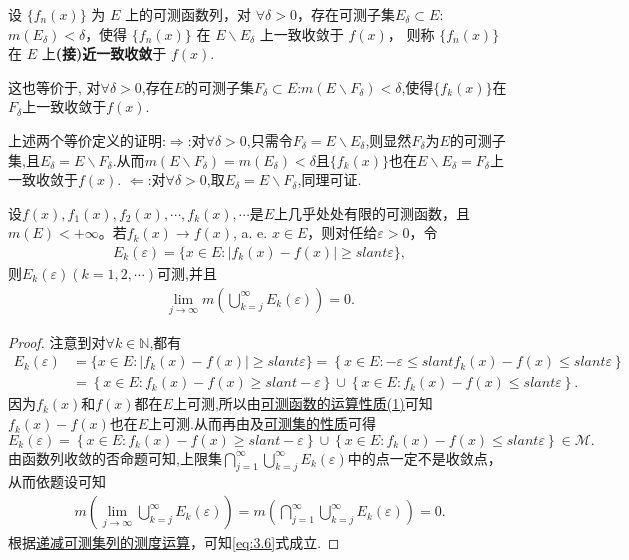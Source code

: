 \documentclass[../../main.tex]{subfiles}
\begin{document}
\begin{definition}[(接)近一致收敛]
设 $\{f_n(x)\}$ 为 $E$ 上的可测函数列，对 $\forall\delta > 0$，存在可测子集$E_\delta\subset E$:$m(E_\delta) < \delta$，使得 $\{f_n(x)\}$ 在 $E\backslash E_\delta$ 上一致收敛于 $f(x)$，
则称 $\{f_n(x)\}$ 在 $E$ 上\textbf{(接)近一致收敛}于 $f(x)$. 

这也等价于,
对$\forall \delta >0$,存在$E$的可测子集$F_\delta\subset E$:$m(E\backslash F_\delta)<\delta$,使得$\{f_k(x)\}$在$F_\delta$上一致收敛于$f(x)$.
\end{definition}
\begin{remark}
上述两个等价定义的证明:$\Rightarrow$:对$\forall \delta >0$,只需令$F_\delta=E\backslash E_\delta$,则显然$F_\delta$为$E$的可测子集,且$E_\delta=E\backslash F_\delta$.从而$m(E\backslash F_\delta)=m(E_\delta)<\delta$且$\{f_k(x)\}$也在$E\backslash E_\delta=F_\delta$上一致收敛于$f(x)$.
$\Leftarrow$:对$\forall \delta >0$,取$E_\delta=E\backslash F_\delta$,同理可证.
\end{remark}

\begin{lemma}\label{lemma:引理3.11}
设$f(x), f_1(x), f_2(x), \cdots, f_k(x), \cdots$是$E$上几乎处处有限的可测函数，且$m(E) < +\infty$。若$f_k(x) \to f(x)$, a. e. $x \in E$，则对任给$\varepsilon > 0$，令
\begin{align*}
E_k(\varepsilon) = \{x \in E: |f_k(x) - f(x)| \geqslant slant \varepsilon\},
\end{align*}
则$E_k(\varepsilon)(k=1,2,\cdots)$可测,并且
\begin{align}
\lim_{j \to \infty} m\left( \bigcup_{k = j}^{\infty} E_k(\varepsilon) \right) = 0. \label{eq:3.6}
\end{align}
\end{lemma}
\begin{proof}
注意到对$\forall k\in \mathbb{N}$,都有
\begin{align*}
E_k(\varepsilon )&=\{x\in E:|f_k(x)-f(x)|\geqslant slant \varepsilon \}=\left\{ x\in E:-\varepsilon \leqslant slant f_k(x)-f(x)\leqslant slant \varepsilon \right\} 
\\
&=\left\{ x\in E:f_k(x)-f(x)\geqslant slant -\varepsilon \right\} \cup \left\{ x\in E:f_k(x)-f(x)\leqslant slant \varepsilon \right\} .
\end{align*}
因为$f_k(x)$和$f(x)$都在$E$上可测,所以由\hyperref[theorem:可测函数的运算性质]{可测函数的运算性质(1)}可知$f_k(x)-f(x)$也在$E$上可测.从而再由及\hyperref[theorem:可测集的性质]{可测集的性质}可得
\[
E_k(\varepsilon)=\left\{ x\in E:f_k(x)-f(x)\geqslant slant -\varepsilon \right\} \cup \left\{ x\in E:f_k(x)-f(x)\leqslant slant \varepsilon \right\}\in \mathscr{M}.
\]
由函数列收敛的否命题可知,上限集$\bigcap_{j = 1}^{\infty} \bigcup_{k = j}^{\infty} E_k(\varepsilon)$中的点一定不是收敛点，从而依题设可知
\begin{align*}
m\left( \lim_{j \to \infty}\bigcup_{k = j}^{\infty} E_k(\varepsilon) \right)=m\left( \bigcap_{j = 1}^{\infty} \bigcup_{k = j}^{\infty} E_k(\varepsilon) \right) = 0.
\end{align*}
根据\hyperref[corollary:递减可测集列的测度运算]{递减可测集列的测度运算}，可知\eqref{eq:3.6}式成立.
\end{proof}
\end{document}
